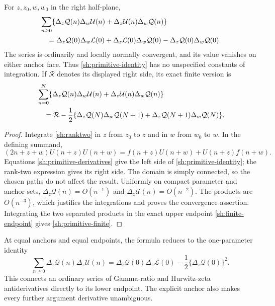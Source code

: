 \begin{theorem}
\label{sh:primitive-theorem}
For $z,z_0,w,w_0$ in the right half-plane,
\begin{align}\label{sh:primitive-identity}
 &\sum_{n\ge0}\{\Delta_z\mathcal Q(n)\Delta_w\mathcal U(n)
                 +\Delta_z\mathcal U(n)\Delta_w\mathcal Q(n)\}\notag\\
 &\quad=\Delta_z\mathcal Q(0)\Delta_w\mathcal L(0)
       +\Delta_z\mathcal L(0)\Delta_w\mathcal Q(0)
       -\Delta_z\mathcal Q(0)\Delta_w\mathcal Q(0).
\end{align}
The series is ordinarily and locally normally convergent, and its
value vanishes on either anchor face. Thus \eqref{sh:primitive-identity}
has no unspecified constants of integration.
If $\mathcal R$ denotes its displayed right side, its exact finite
version is
\begin{align}\label{sh:primitive-finite}
 &\sum_{n=0}^{N}\{\Delta_z\mathcal Q(n)\Delta_w\mathcal U(n)
                 +\Delta_z\mathcal U(n)\Delta_w\mathcal Q(n)\}\notag\\
 &\quad=\mathcal R-\frac12\{\Delta_z\mathcal Q(N)\Delta_w\mathcal Q(N+1)
                       +\Delta_z\mathcal Q(N+1)\Delta_w\mathcal Q(N)\}.
\end{align}
\end{theorem}

\begin{proof}
Integrate \eqref{sh:ranktwo} in $z$ from $z_0$ to $z$ and in $w$
from $w_0$ to $w$. In the defining summand,
\[
 (2n+z+w)U(n+z)U(n+w)
   =f(n+z)U(n+w)+U(n+z)f(n+w).
\]
Equations \eqref{sh:primitive-derivatives} give the left side of
\eqref{sh:primitive-identity}; the rank-two expression gives its
right side. The domain is simply connected, so the chosen paths
do not affect the result. Uniformly on compact parameter and anchor
sets, $\Delta_z\mathcal Q(n)=O(n^{-1})$ and
$\Delta_z\mathcal U(n)=O(n^{-2})$. The products are $O(n^{-3})$,
which justifies the integrations and proves the convergence assertion.
Integrating the two separated products in the exact upper endpoint
\eqref{sh:finite-endpoint} gives \eqref{sh:primitive-finite}.
\end{proof}

At equal anchors and equal endpoints, the formula reduces to the
one-parameter identity
\[
 \sum_{n\ge0}\Delta_z\mathcal Q(n)\Delta_z\mathcal U(n)
       =\Delta_z\mathcal Q(0)\Delta_z\mathcal L(0)
                            -\frac12\{\Delta_z\mathcal Q(0)\}^2.
\]
This connects an ordinary series of Gamma-ratio and Hurwitz-zeta
antiderivatives directly to its lower endpoint. The explicit anchor
also makes every further argument derivative unambiguous.

